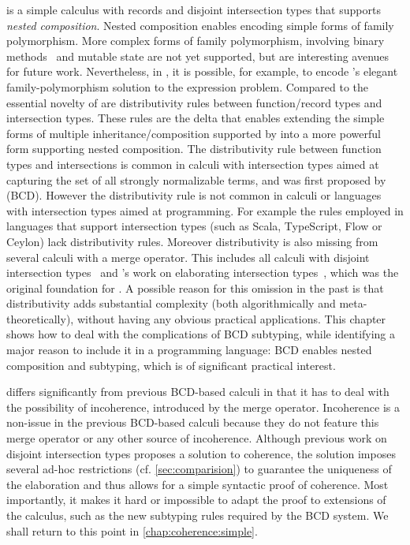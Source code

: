 \namee is a simple calculus with records and disjoint intersection types that
supports \emph{nested composition}. Nested composition enables encoding simple
forms of family polymorphism. More complex forms of family polymorphism,
involving binary methods~\citep{bruce1995binary} and mutable state are not yet
supported, but are interesting avenues for future work. Nevertheless, in \namee,
it is possible, for example, to encode \citeauthor{ernst2004expression}'s elegant family-polymorphism
solution to the expression problem. Compared to \oname the essential novelty of
\namee are distributivity rules between function/record types and intersection
types. These rules are the delta that enables extending the simple forms of
multiple inheritance/composition supported by \oname into a more powerful form
supporting nested composition. The distributivity rule between function types
and intersections is common in calculi with intersection types aimed at
capturing the set of all strongly normalizable terms, and was first proposed by
\citet{Barendregt_1983} (BCD). However the distributivity rule is not common in
calculi or languages with intersection types aimed at programming. For example
the rules employed in languages that support intersection types (such as Scala,
TypeScript, Flow or Ceylon) lack distributivity rules. Moreover distributivity
is also missing from several calculi with a merge operator. This includes all
calculi with disjoint intersection types~\citep{oliveira2016disjoint, alpuimdisjoint}
and \citeauthor{dunfield2014elaborating}'s work on elaborating
intersection types~\citep{dunfield2014elaborating}, which was the original
foundation for \oname. A possible reason for this omission in the past is that
distributivity adds substantial complexity (both algorithmically and
meta-theoretically), without having any obvious practical applications. This
chapter shows how to deal with the complications of BCD subtyping, while
identifying a major reason to include it in a programming language: BCD enables
nested composition and subtyping, which is of significant practical interest.


\namee differs significantly from previous BCD-based calculi in that it has to
deal with the possibility of incoherence, introduced by the merge operator. Incoherence
is a non-issue in the previous BCD-based calculi because they do not feature
this merge operator or any other source of incoherence.
Although previous work on disjoint intersection types
proposes a solution to coherence, the solution imposes several ad-hoc restrictions (cf. \cref{sec:comparision})
to guarantee the uniqueness of the elaboration and thus allows for a simple
syntactic proof of coherence. Most
importantly, it makes it hard or impossible to adapt the proof to extensions of
the calculus, such as the new subtyping rules required by the BCD system.
We shall return to this point in
\cref{chap:coherence:simple}.





% 



